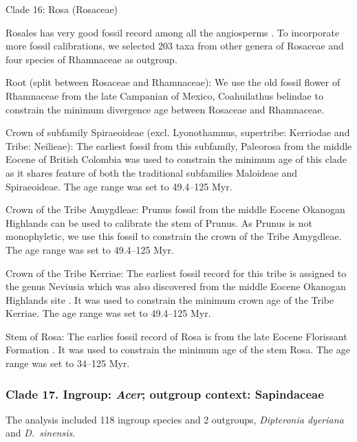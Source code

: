 \documentclass[10pt]{article}
\begin{document}
Clade 16: Rosa (Rosaceae)

Rosales has very good fossil record among all the angiosperms
\citep{Xing2016}. To incorporate more fossil calibrations, we selected
203 taxa from other genera of Rosaceae and four species of Rhamnaceae
as outgroup.

Root (split between Rosaceae and Rhamnaceae): We use the old fossil
flower of Rhamnaceae from the late Campanian of Mexico, Coahuilathus
belindae \citep{Calvillo-Canadell2007} to constrain the minimum
divergence age between Rosaceae and Rhamnaceae.

Crown of subfamily Spiraeoideae (excl. Lyonothamnus, supertribe:
Kerriodae and Tribe: Neilieae): The earliest fossil from this
subfamily, Paleorosa from the middle Eocene of British Colombia
\citep{Basinger1976} was used to constrain the minimum age of this
clade as it shares feature of both the traditional subfamilies
Maloideae and Spiraeoideae. The age range was set to 49.4--125 Myr.

Crown of the Tribe Amygdleae: Prunus fossil from the middle Eocene
Okanogan Highlands \citep{DeVore2007} can be used to calibrate the
stem of Prunus. As Prunus is not monophyletic, we use this fossil to
constrain the crown of the Tribe Amygdleae. The age range was set to
49.4--125 Myr.

Crown of the Tribe Kerriae: The earliest fossil record for this tribe
is assigned to the genus Neviusia which was also discovered from the
middle Eocene Okanogan Highlands site \citep{DeVore2004}. It was used
to constrain the minimum crown age of the Tribe Kerriae. The age range
was set to 49.4--125 Myr.

Stem of Rosa: The earlies fossil record of Rosa is from the late
Eocene Florissant Formation \citep{Manchester2001}. It was used to
constrain the minimum age of the stem Rosa. The age range was set to
34--125 Myr.

\subsubsection*{Clade 17. Ingroup: \textit{Acer}; outgroup context:
  Sapindaceae}

The analysis included 118 ingroup species and 2 outgroups,
\textit{Dipteronia dyeriana} and \textit{D.~sinensis}.
\end{document}
